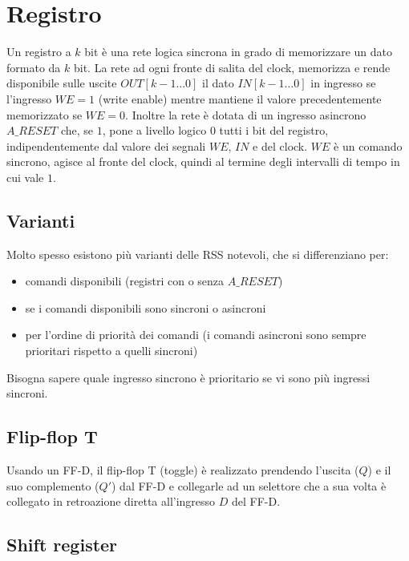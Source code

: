 \documentclass{subfiles}
\begin{document}
\section{Registro}

Un registro a $k$ bit è una rete logica sincrona in grado di memorizzare un dato formato da $k$ bit.
La rete ad ogni fronte di salita del clock, memorizza e rende disponibile sulle uscite $OUT[k-1 \dots 0]$ il dato $IN[k-1 \dots 0]$ in ingresso se l'ingresso $WE = 1$ (write enable) mentre mantiene il valore precedentemente memorizzato se $WE = 0$.
Inoltre la rete è dotata di un ingresso asincrono $A\_RESET$ che, se $1$, pone a livello logico $0$ tutti i bit del registro, indipendentemente dal valore dei segnali $WE$, $IN$ e del clock.
$WE$ è un comando sincrono, agisce al fronte del clock, quindi al termine degli intervalli di tempo in cui vale $1$.

\subsection{Varianti}

Molto spesso esistono più varianti delle RSS notevoli, che si differenziano per:

\begin{itemize}
    \item comandi disponibili (registri con o senza $A\_RESET$)
    \item se i comandi disponibili sono sincroni o asincroni
    \item per l'ordine di priorità dei comandi (i comandi asincroni sono sempre prioritari rispetto a quelli sincroni)
\end{itemize}

\noindent
Bisogna sapere quale ingresso sincrono è prioritario se vi sono più ingressi sincroni.

\subsection{Flip-flop T}

Usando un FF-D, il flip-flop T (toggle) è realizzato prendendo l'uscita ($Q$) e il suo complemento ($Q'$) dal FF-D e collegarle ad un selettore che a sua volta è collegato in retroazione diretta all'ingresso $D$ del FF-D.

\subsection{Shift register}
\end{document}
